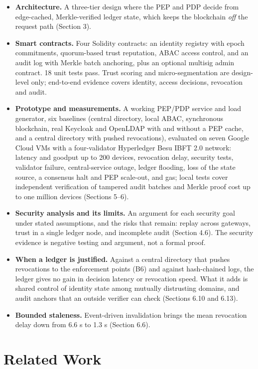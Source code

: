 \documentclass[a4paper,5p,times,twocolumn,number,sort&compress]{elsarticle}
\begin{document}
\begin{itemize}
\item \textbf{Architecture.} A three-tier design where the PEP and PDP decide from edge-cached, Merkle-verified ledger state, which keeps the blockchain \emph{off} the request path (Section 3).
\item \textbf{Smart contracts.} Four Solidity contracts: an identity registry with epoch commitments, quorum-based trust reputation, ABAC access control, and an audit log with Merkle batch anchoring, plus an optional multisig admin contract. 18 unit tests pass. Trust scoring and micro-segmentation are design-level only; end-to-end evidence covers identity, access decisions, revocation and audit.
\item \textbf{Prototype and measurements.} A working PEP/PDP service and load generator, six baselines (central directory, local ABAC, synchronous blockchain, real Keycloak and OpenLDAP with and without a PEP cache, and a central directory with pushed revocations), evaluated on seven Google Cloud VMs with a four-validator Hyperledger Besu IBFT 2.0 network: latency and goodput up to 200 devices, revocation delay, security tests, validator failure, central-service outage, ledger flooding, loss of the state source, a consensus halt and PEP scale-out, and gas; local tests cover independent verification of tampered audit batches and Merkle proof cost up to one million devices (Sections 5--6).
\item \textbf{Security analysis and its limits.} An argument for each security goal under stated assumptions, and the risks that remain: replay across gateways, trust in a single ledger node, and incomplete audit (Section 4.6). The security evidence is negative testing and argument, not a formal proof.
\item \textbf{When a ledger is justified.} Against a central directory that pushes revocations to the enforcement points (B6) and against hash-chained logs, the ledger gives no gain in decision latency or revocation speed. What it adds is shared control of identity state among mutually distrusting domains, and audit anchors that an outside verifier can check (Sections 6.10 and 6.13).
\item \textbf{Bounded staleness.} Event-driven invalidation brings the mean revocation delay down from 6.6 s to 1.3 s (Section 6.6).
\end{itemize}

\section{Related Work}
\end{document}
